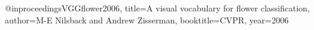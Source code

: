 @inproceedings{VGGflower2006,
  title={A visual vocabulary for flower classification},
  author={M-E Nilsback and Andrew Zisserman},
  booktitle={CVPR},
  year={2006}
}


